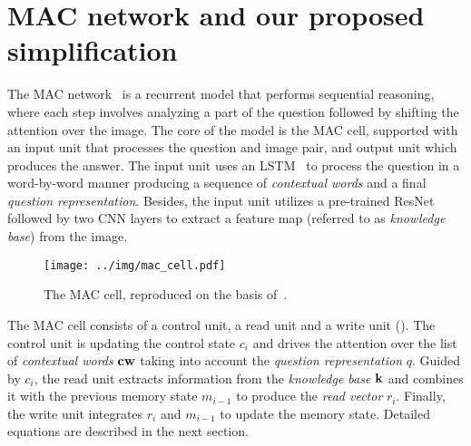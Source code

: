 \section{MAC network and our proposed simplification}
\label{sec:models}


The MAC network~\cite{hudson2018compositional} is a recurrent model that performs sequential reasoning, where each step involves analyzing a part of the question followed by shifting the attention over the image.
The core of the model is the MAC cell, supported with an input unit that processes the question and image pair, and output unit which produces the answer.
The input unit  uses an LSTM~\cite{hochreiter1997long} to process the question in a word-by-word manner producing a sequence of \emph{contextual words} and a final \emph{question representation}.
Besides, the input unit utilizes a pre-trained ResNet~\cite{he2016resnet} followed by two CNN layers to extract a feature map (referred to as \emph{knowledge base}) from the image.

\begin{wrapfigure}{r}[5pt]{0.4\textwidth}
	\vspace{-15pt}
	\centering
	\texttt{[image: ../img/mac\_cell.pdf]}
	\caption{The MAC cell, reproduced on the basis of~\cite{hudson2018compositional}.}
	\label{fig:mac_cell}
	\vspace{-5pt}
\end{wrapfigure}

	
The MAC cell consists of a control unit, a read unit and a write unit ().
The control unit is updating the control state $c_i$ and drives the attention over the list of \emph{contextual words} $\mathbf{cw}$ taking into account the \emph{question representation} $q$.
Guided by $c_i$,  the read unit extracts information from the \emph{knowledge base} $\mathbf{k}$ and combines it with the previous memory state $m_{i-1}$  to produce the \emph{read vector} $r_i$.
Finally, the write unit integrates $r_i$ and $m_{i-1}$ to update the memory state. Detailed equations are described in the next section.
